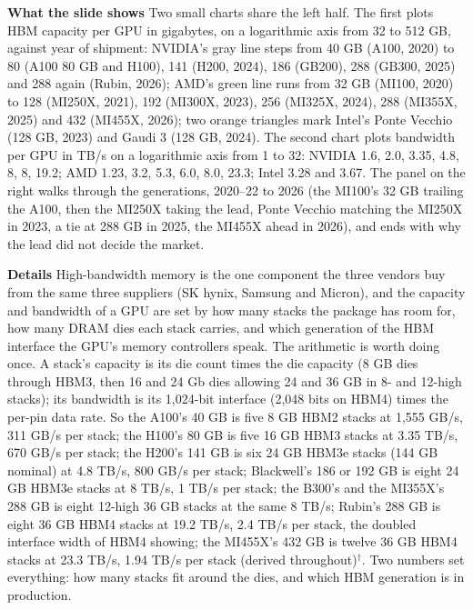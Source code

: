 \documentclass[11pt,letterpaper]{article}
\newcommand{\para}[1]{\medskip\noindent\textbf{#1}\quad}
\begin{document}
\para{What the slide shows} Two small charts share the left half. The first plots HBM capacity per GPU in gigabytes, on a logarithmic axis from 32 to 512 GB, against year of shipment: NVIDIA's gray line steps from 40 GB (A100, 2020) to 80 (A100 80 GB and H100), 141 (H200, 2024), 186 (GB200), 288 (GB300, 2025) and 288 again (Rubin, 2026); AMD's green line runs from 32 GB (MI100, 2020) to 128 (MI250X, 2021), 192 (MI300X, 2023), 256 (MI325X, 2024), 288 (MI355X, 2025) and 432 (MI455X, 2026); two orange triangles mark Intel's Ponte Vecchio (128 GB, 2023) and Gaudi 3 (128 GB, 2024). The second chart plots bandwidth per GPU in TB/s on a logarithmic axis from 1 to 32: NVIDIA 1.6, 2.0, 3.35, 4.8, 8, 8, 19.2; AMD 1.23, 3.2, 5.3, 6.0, 8.0, 23.3; Intel 3.28 and 3.67. The panel on the right walks through the generations, 2020--22 to 2026 (the MI100's 32 GB trailing the A100, then the MI250X taking the lead, Ponte Vecchio matching the MI250X in 2023, a tie at 288 GB in 2025, the MI455X ahead in 2026), and ends with why the lead did not decide the market.

\para{Details} High-bandwidth memory is the one component the three vendors buy from the same three suppliers (SK hynix, Samsung and Micron), and the capacity and bandwidth of a GPU are set by how many stacks the package has room for, how many DRAM dies each stack carries, and which generation of the HBM interface the GPU's memory controllers speak. The arithmetic is worth doing once. A stack's capacity is its die count times the die capacity (8 GB dies through HBM3, then 16 and 24 Gb dies allowing 24 and 36 GB in 8- and 12-high stacks); its bandwidth is its 1{,}024-bit interface (2{,}048 bits on HBM4) times the per-pin data rate. So the A100's 40 GB is five 8 GB HBM2 stacks at 1{,}555 GB/s, 311 GB/s per stack; the H100's 80 GB is five 16 GB HBM3 stacks at 3.35 TB/s, 670 GB/s per stack; the H200's 141 GB is six 24 GB HBM3e stacks (144 GB nominal) at 4.8 TB/s, 800 GB/s per stack; Blackwell's 186 or 192 GB is eight 24 GB HBM3e stacks at 8 TB/s, 1 TB/s per stack; the B300's and the MI355X's 288 GB is eight 12-high 36 GB stacks at the same 8 TB/s; Rubin's 288 GB is eight 36 GB HBM4 stacks at 19.2 TB/s, 2.4 TB/s per stack, the doubled interface width of HBM4 showing; the MI455X's 432 GB is twelve 36 GB HBM4 stacks at 23.3 TB/s, 1.94 TB/s per stack (derived throughout)$^\dagger$. Two numbers set everything: how many stacks fit around the dies, and which HBM generation is in production.
\end{document}
